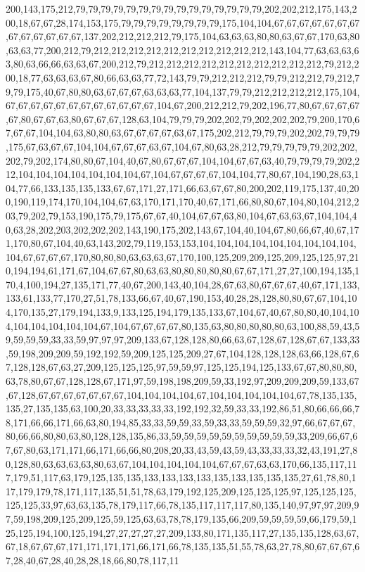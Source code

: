 200,143,175,212,79,79,79,79,79,79,79,79,79,79,79,79,79,79,79,202,202,212,175,143,200,18,67,67,28,174,153,175,79,79,79,79,79,79,79,79,175,104,104,67,67,67,67,67,67,67,67,67,67,67,67,67,137,202,212,212,212,79,175,104,63,63,63,80,80,63,67,67,170,63,80,63,63,77,200,212,79,212,212,212,212,212,212,212,212,212,212,143,104,77,63,63,63,63,80,63,66,66,63,63,67,200,212,79,212,212,212,212,212,212,212,212,212,212,79,212,200,18,77,63,63,63,67,80,66,63,63,77,72,143,79,79,212,212,212,79,79,212,212,79,212,79,79,175,40,67,80,80,63,67,67,67,63,63,63,77,104,137,79,79,212,212,212,212,175,104,67,67,67,67,67,67,67,67,67,67,67,67,104,67,200,212,212,79,202,196,77,80,67,67,67,67,67,80,67,67,63,80,67,67,67,128,63,104,79,79,79,202,202,79,202,202,202,79,200,170,67,67,67,104,104,63,80,80,63,67,67,67,67,63,67,175,202,212,79,79,79,202,202,79,79,79,175,67,63,67,67,104,104,67,67,67,63,67,104,67,80,63,28,212,79,79,79,79,79,202,202,202,79,202,174,80,80,67,104,40,67,80,67,67,67,104,104,67,67,63,40,79,79,79,79,202,212,104,104,104,104,104,104,104,67,104,67,67,67,67,104,104,77,80,67,104,190,28,63,104,77,66,133,135,135,133,67,67,171,27,171,66,63,67,67,80,200,202,119,175,137,40,200,190,119,174,170,104,104,67,63,170,171,170,40,67,171,66,80,80,67,104,80,104,212,203,79,202,79,153,190,175,79,175,67,67,40,104,67,67,63,80,104,67,63,63,67,104,104,40,63,28,202,203,202,202,202,143,190,175,202,143,67,104,40,104,67,80,66,67,40,67,171,170,80,67,104,40,63,143,202,79,119,153,153,104,104,104,104,104,104,104,104,104,104,67,67,67,67,170,80,80,80,63,63,63,67,170,100,125,209,209,125,209,125,125,97,210,194,194,61,171,67,104,67,67,80,63,63,80,80,80,80,80,67,67,171,27,27,100,194,135,170,4,100,194,27,135,171,77,40,67,200,143,40,104,28,67,63,80,67,67,67,40,67,171,133,133,61,133,77,170,27,51,78,133,66,67,40,67,190,153,40,28,28,128,80,80,67,67,104,104,170,135,27,179,194,133,9,133,125,194,179,135,133,67,104,67,40,67,80,80,40,104,104,104,104,104,104,104,67,104,67,67,67,67,80,135,63,80,80,80,80,80,63,100,88,59,43,59,59,59,59,33,33,59,97,97,97,209,133,67,128,128,80,66,63,67,128,67,128,67,67,133,33,59,198,209,209,59,192,192,59,209,125,125,209,27,67,104,128,128,128,63,66,128,67,67,128,128,67,63,27,209,125,125,125,97,59,59,97,125,125,194,125,133,67,67,80,80,80,63,78,80,67,67,128,128,67,171,97,59,198,198,209,59,33,192,97,209,209,209,59,133,67,67,128,67,67,67,67,67,67,67,104,104,104,104,67,104,104,104,104,104,67,78,135,135,135,27,135,135,63,100,20,33,33,33,33,33,192,192,32,59,33,33,192,86,51,80,66,66,66,78,171,66,66,171,66,63,80,194,85,33,33,59,59,33,59,33,33,59,59,59,32,97,66,67,67,67,80,66,66,80,80,63,80,128,128,135,86,33,59,59,59,59,59,59,59,59,59,59,33,209,66,67,67,67,80,63,171,171,66,171,66,66,80,208,20,33,43,59,43,59,43,33,33,33,32,43,191,27,80,128,80,63,63,63,63,80,63,67,104,104,104,104,104,67,67,67,63,63,170,66,135,117,117,179,51,117,63,179,125,135,135,133,133,133,133,135,133,135,135,135,27,61,78,80,117,179,179,78,171,117,135,51,51,78,63,179,192,125,209,125,125,125,97,125,125,125,125,125,33,97,63,63,135,78,179,117,66,78,135,117,117,117,80,135,140,97,97,97,209,97,59,198,209,125,209,125,59,125,63,63,78,78,179,135,66,209,59,59,59,59,66,179,59,125,125,194,100,125,194,27,27,27,27,27,209,133,80,171,135,117,27,135,135,128,63,67,67,18,67,67,67,171,171,171,171,66,171,66,78,135,135,51,55,78,63,27,78,80,67,67,67,67,28,40,67,28,40,28,28,18,66,80,78,117,11